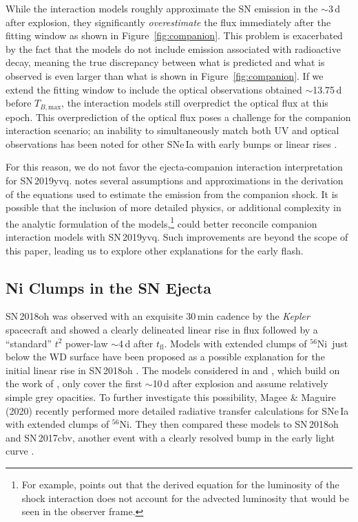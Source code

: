\documentclass[twocolumn]{aastex63}
\newcommand{\tfl}{$t_\mathrm{fl}$}
\newcommand{\tbmax}{$T_{B,\mathrm{max}}$}
\newcommand{\radni}{$^{56}$Ni}
\newcommand{\sn}{SN\,2019yvq}
\begin{document}
While the interaction models roughly approximate the SN emission in the
$\sim$3\,d after explosion, they significantly \textit{overestimate} the flux
immediately after the fitting window as shown in Figure~\ref{fig:companion}.
This problem is exacerbated by the fact that the models do not include
emission associated with radioactive decay, meaning the true discrepancy
between what is predicted and what is observed is even larger than what is
shown in Figure~\ref{fig:companion}. If we extend the fitting window to
include the optical observations obtained $\sim$13.75\,d before \tbmax, the
interaction models still overpredict the optical flux at this epoch. This
overprediction of the optical flux poses a challenge for the companion
interaction scenario; an inability to simultaneously match both UV and optical
observations has been noted for other SNe\,Ia with early bumps or linear rises
\citep{Hosseinzadeh17,Miller18}.

For this reason, we do not favor the ejecta-companion interaction
interpretation for \sn. \citet{Kasen10a} notes several assumptions and
approximations in the derivation of the equations used to estimate the
emission from the companion shock. It is possible that the inclusion of more
detailed physics, or additional complexity in the analytic formulation of the
models,\footnote{For example, \citet{Kasen10a} points out that the derived
equation for the luminosity of the shock interaction does not account for the
advected luminosity that would be seen in the observer frame.} could better
reconcile companion interaction models with \sn. Such improvements are beyond
the scope of this paper, leading us to explore other explanations for the
early flash.

\subsection{Ni Clumps in the SN Ejecta}

SN\,2018oh was observed with an exquisite 30\,min cadence by the
\textit{Kepler} spacecraft and showed a clearly delineated linear rise in
flux followed by a ``standard'' $t^2$ power-law $\sim$4\,d after \tfl. Models
with extended clumps of \radni\ just below the WD surface have been proposed
as a possible explanation for the initial linear rise in SN\,2018oh
\citep{Shappee19,Dimitriadis19}. The models considered in \citet{Shappee19}
and \citet{Dimitriadis19}, which build on the work of \citet{Piro16}, only
cover the first $\sim$10\,d after explosion and assume relatively simple grey
opacities. To further investigate this possibility, Magee \& Maguire (2020)
recently performed more detailed radiative transfer calculations for SNe\,Ia
with extended clumps of \radni. They then compared these models to SN\,2018oh
and SN\,2017cbv, another event with a clearly resolved bump in the early
light curve \citep{Hosseinzadeh17}.
\end{document}
